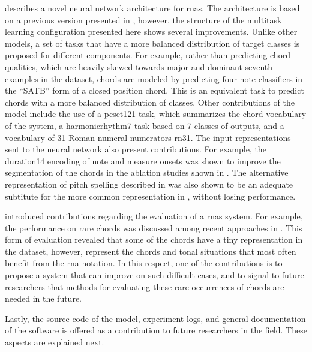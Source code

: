  describes a novel neural network
architecture for \glspl{rna}. The architecture is based on a
previous version presented in
\textcite{napoleslopez2021augmentednet}, however, the
structure of the multitask learning configuration presented
here shows several improvements. Unlike other models, a set
of tasks that have a more balanced distribution of target
classes is proposed for different components. For example,
rather than predicting chord qualities, which are heavily
skewed towards major and dominant seventh examples in the
dataset, chords are modeled by predicting four note
classifiers in the ``SATB'' form of a closed position chord.
This is an equivalent task to predict chords with a more
balanced distribution of classes. Other contributions of the
model include the use of a \gls{pcset121} task, which
summarizes the chord vocabulary of the system, a
\gls{harmonicrhythm7} task based on 7 classes of outputs,
and a vocabulary of 31 Roman numeral numerators \gls{rn31}.
The input representations sent to the neural network also
present contributions. For example, the \gls{duration14}
encoding of note and measure onsets was shown to improve the
segmentation of the chords in the ablation studies shown in
. The alternative
representation of pitch spelling described in
 was also shown to be an
adequate subtitute for the more common representation in
, without losing
performance.

 introduced contributions
regarding the evaluation of a \glspl{rna} system. For
example, the performance on rare chords was discussed among
recent approaches in . This
form of evaluation revealed that some of the chords have a
tiny representation in the dataset, however, represent the
chords and tonal situations that most often benefit from the
\gls{rna} notation. In this respect, one of the
contributions is to propose a system that can improve on
such difficult cases, and to signal to future researchers
that methods for evaluating these rare occurrences of chords
are needed in the future.

Lastly, the source code of the model, experiment logs, and
general documentation of the software is offered as a
contribution to future researchers in the field. These
aspects are explained next.
